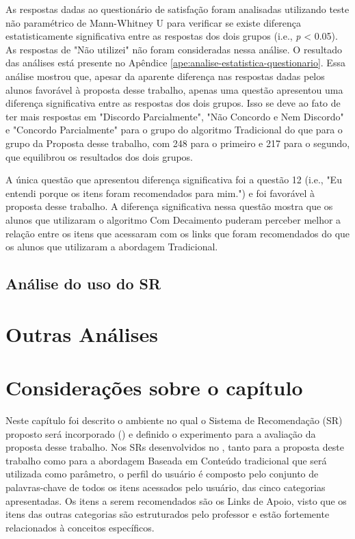 As respostas dadas ao questionário de satisfação foram analisadas utilizando teste não paramétrico de
Mann-Whitney U para verificar se existe diferença estatisticamente significativa entre as respostas dos dois grupos (i.e., \textit{p} < 0.05).
As respostas de "Não utilizei" não foram consideradas nessa análise. O resultado das análises está presente no Apêndice
\ref{ape:analise-estatistica-questionario}. Essa análise mostrou que, apesar da aparente diferença nas respostas dadas
pelos alunos favorável à proposta desse trabalho, apenas uma questão apresentou uma diferença significativa entre as
respostas dos dois grupos. Isso se deve ao fato de ter mais respostas em "Discordo Parcialmente",
"Não Concordo e Nem Discordo" e "Concordo Parcialmente" para o grupo do algoritmo Tradicional do que para o grupo da
Proposta desse trabalho, com 248 para o primeiro e 217 para o segundo, que equilibrou os resultados dos dois grupos.

A única questão que apresentou diferença significativa foi a questão 12 (i.e., "Eu entendi porque os
itens foram recomendados para mim.") e foi favorável à proposta desse trabalho. A diferença significativa nessa questão
mostra que os alunos que utilizaram o algoritmo Com Decaimento puderam perceber melhor a relação entre os itens que acessaram
com os links que foram recomendados do que os alunos que utilizaram a abordagem Tradicional.

\subsection{Análise do uso do SR}\label{subsection:analise-uso-sr}

\section{Outras Análises}\label{section:outras-analises}

\section{Considerações sobre o capítulo}

Neste capítulo foi descrito o ambiente no qual o Sistema de Recomendação (SR) proposto será incorporado (\adaptweb) e definido o
experimento para a avaliação da proposta desse trabalho. Nos SRs desenvolvidos no \adaptweb, tanto para a proposta deste trabalho como para a abordagem
Baseada em Conteúdo tradicional que será utilizada como parâmetro, o perfil do usuário é composto pelo conjunto de palavras-chave de todos os itens acessados pelo usuário, das
cinco categorias apresentadas. Os itens a serem recomendados são os Links de Apoio, visto que os itens das outras categorias
são estruturados pelo professor e estão fortemente relacionados à conceitos específicos.

